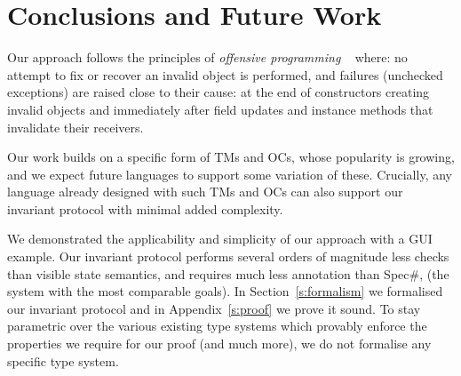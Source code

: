 
\section{Conclusions and Future Work}
\label{s:conclusion}
Our approach follows the principles of \emph{offensive programming}
~\cite{stephens2015beginning} where:
no attempt to fix or recover an invalid object is performed, and
 failures (unchecked exceptions)
		are raised close to their cause: at the end of constructors creating invalid objects and immediately after field updates and instance methods that invalidate their receivers.



Our work builds on a specific form of TMs and OCs, whose
popularity is growing, and we expect future languages to support some variation of these.
Crucially, any language already designed with such TMs and OCs
can also support our invariant protocol with minimal added complexity.


We demonstrated the applicability and simplicity of our approach with a GUI example.
Our invariant protocol performs several orders of magnitude less checks than visible state semantics, and requires much less annotation 
than Spec\#, (the system with the most comparable goals). In Section~\ref{s:formalism} we formalised our invariant protocol and in Appendix~\ref{s:proof} we prove it sound.
To stay parametric over the various existing type systems which provably enforce the properties we require for our proof (and much more), we do not formalise any specific type system.




